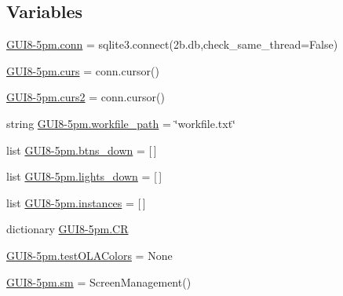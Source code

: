 \subsection*{Variables}
\begin{DoxyCompactItemize}
\item 
\hyperlink{namespaceGUI8-5pm_a754cc5d2663b1ceb611c13b8e4ec91ad}{G\+U\+I8-\/5pm.\+conn} = sqlite3.\+connect(\textquotesingle{}2b.\+db\textquotesingle{},check\+\_\+same\+\_\+thread=\+False)
\item 
\hyperlink{namespaceGUI8-5pm_adfad6340169cdc0fa55a47953d6320a0}{G\+U\+I8-\/5pm.\+curs} = conn.\+cursor()
\item 
\hyperlink{namespaceGUI8-5pm_acbb42dfb89c49147b15b0355fa744c45}{G\+U\+I8-\/5pm.\+curs2} = conn.\+cursor()
\item 
string \hyperlink{namespaceGUI8-5pm_a508b4e6132ee7dc30a64d3138ca931f1}{G\+U\+I8-\/5pm.\+workfile\+\_\+path} = \char`\"{}workfile.\+txt\char`\"{}
\item 
list \hyperlink{namespaceGUI8-5pm_a90613e2e5dbe99c084c15b8d8d7d83fa}{G\+U\+I8-\/5pm.\+btns\+\_\+down} = \mbox{[}$\,$\mbox{]}
\item 
list \hyperlink{namespaceGUI8-5pm_a2d5665b7141552d71c310888d41efbd7}{G\+U\+I8-\/5pm.\+lights\+\_\+down} = \mbox{[}$\,$\mbox{]}
\item 
list \hyperlink{namespaceGUI8-5pm_ac6f3b5abf90a01b9e7266f0ebbc1b5e8}{G\+U\+I8-\/5pm.\+instances} = \mbox{[}$\,$\mbox{]}
\item 
dictionary \hyperlink{namespaceGUI8-5pm_a14d7ab1cf4721110f93f3f0b29286697}{G\+U\+I8-\/5pm.\+CR}
\item 
\hyperlink{namespaceGUI8-5pm_ab68e1f0d94f4a00210276fed699faaf7}{G\+U\+I8-\/5pm.\+test\+O\+L\+A\+Colors} = None
\item 
\hyperlink{namespaceGUI8-5pm_a6e831d571cc3bc2fd29a3c47972ede7d}{G\+U\+I8-\/5pm.\+sm} = Screen\+Management()
\end{DoxyCompactItemize}

